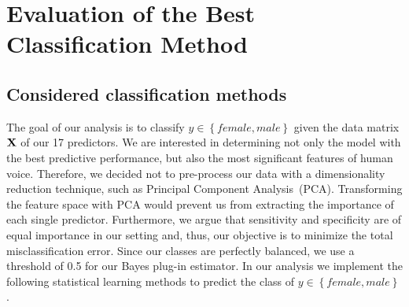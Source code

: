 \chapter{Evaluation of the Best Classification Method}
\label{chapter_classification}
\section{Considered classification methods}
\label{sec_considered_classif}
The goal of our analysis is to classify $y \in \left\lbrace female, male \right\rbrace $ given the data matrix $\mathbf{X}$ of our 17 predictors. 
We are interested in determining not only the model with the best predictive performance, but also the most significant features of human voice. Therefore, we decided not to pre-process our data with a dimensionality reduction technique, such as Principal Component Analysis~(PCA). Transforming the feature space with PCA would prevent us from extracting the importance of each single predictor.
Furthermore, we argue that sensitivity and specificity are of equal importance in our setting and, thus, our objective is to minimize the total misclassification error. 
Since our classes are perfectly balanced, we use a threshold of \num{0.5} for our Bayes plug-in estimator.
In our analysis we implement the following statistical learning methods to predict the class of $ y \in \left\lbrace female, male \right\rbrace$.

